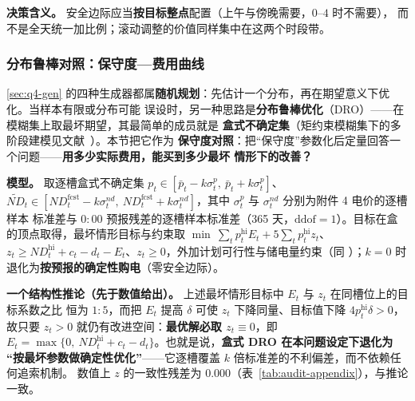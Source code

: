 \textbf{决策含义。} 安全边际应当\textbf{按目标整点}配置（上午与傍晚需要，\(0\)--\(4\) 时不需要），
而不是全天统一加比例；滚动调整的价值同样集中在这两个时段带。


\subsubsection{分布鲁棒对照：保守度—费用曲线}
\label{sec:q4-dro}

\ref{sec:q4-gen} 的四种生成器都属\textbf{随机规划}：先估计一个分布，再在期望意义下优化。当样本有限或分布可能
误设时，另一种思路是\textbf{分布鲁棒优化}（DRO）——在模糊集上取最坏期望，其最简单的成员就是
\textbf{盒式不确定集}（矩约束模糊集下的多阶段建模见文献~\cite{refyuhaodong}）。本节把它作为
\textbf{保守度对照}：把“保守度”参数化后定量回答一个问题——\textbf{用多少实际费用，能买到多少最坏
情形下的改善？}

\textbf{模型。} 取逐槽盒式不确定集
\(p_t\in[\bar p_t-k\sigma^p_t,\ \bar p_t+k\sigma^p_t]\)、
\(\widetilde{ND}_t\in[ND^{\text{fcst}}_t-k\sigma^{nd}_t,\ ND^{\text{fcst}}_t+k\sigma^{nd}_t]\)，其中 \(\sigma^p_t\) 与 \(\sigma^{nd}_t\) 分别为附件 4 电价的逐槽样本
标准差与 \(0{:}00\) 预报残差的逐槽样本标准差（365 天，\(\mathrm{ddof}=1\)）。目标在盒的顶点取得，最坏情形目标与约束取
\(\min\ \sum_t p^{\text{hi}}_tE_t+5\sum_t p^{\text{hi}}_t z_t\)、\(z_t\ge ND^{\text{hi}}_t+c_t-d_t-E_t\)、\(z_t\ge0\)，外加计划可行性与储电量约束（同 ）；\(k=0\) 时退化为\textbf{按预报的确定性购电}（零安全边际）。

\textbf{一个结构性推论（先于数值给出）。} 上述最坏情形目标中 $E_t$ 与 $z_t$ 在同槽位上的目标系数之比
恒为 $1:5$，而把 $E_t$ 提高 $\delta$ 可使 $z_t$ 下降同量、目标值下降 $4p^{\text{hi}}_t\delta>0$，
故只要 $z_t>0$ 就仍有改进空间：\textbf{最优解必取 $z_t\equiv0$}，即
$E_t=\max\{0,\ ND^{\text{hi}}_t+c_t-d_t\}$。也就是说，\textbf{盒式 DRO 在本问题设定下退化为
“按最坏参数做确定性优化”}——它逐槽覆盖 $k$ 倍标准差的不利偏差，而不依赖任何追索机制。
数值上 $z$ 的一致性残差为 $0.000$（表~\ref{tab:audit-appendix}），与推论一致。

